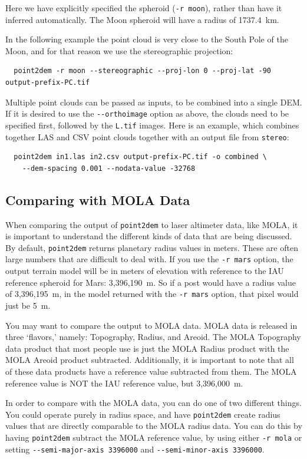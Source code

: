 Here we have explicitly specified the spheroid (\texttt{-r moon}), rather
than have it inferred automatically. The Moon spheroid will have
a radius of 1737.4~km.

In the following example the point cloud is very close to the
South Pole of the Moon, and for that reason we use the stereographic projection:
\begin{verbatim}
  point2dem -r moon --stereographic --proj-lon 0 --proj-lat -90 output-prefix-PC.tif
\end{verbatim}

Multiple point clouds can be passed as inputs, to be combined into a
single \ac{DEM}. If it is desired to use the \texttt{-\/-orthoimage}
option as above, the clouds need to be specified first, followed by the
\texttt{L.tif} images. Here is an example, which combines together LAS
and CSV point clouds together with an output file from {\tt stereo}:
\begin{verbatim}
  point2dem in1.las in2.csv output-prefix-PC.tif -o combined \
    --dem-spacing 0.001 --nodata-value -32768
\end{verbatim}

\subsection{Comparing with MOLA Data}
\label{molacmp}

When comparing the output of \texttt{point2dem} to laser altimeter
data, like MOLA, it is important to understand the different kinds
of data that are being discussed.  By default, \texttt{point2dem}
returns planetary radius values in meters.  These are often large
numbers that are difficult to deal with.  If you use the \texttt{-r
mars} option, the output terrain model will be in meters of elevation
with reference to the IAU reference spheroid for Mars: 3,396,190~m.
So if a post would have a radius value of 3,396,195~m, in the model
returned with the \texttt{-r mars} option, that pixel would just be 5~m.

You may want to compare the output to MOLA data.  MOLA data is
released in three `flavors,' namely: Topography, Radius, and Areoid.
The MOLA Topography data product that most people use is just the MOLA Radius
product with the MOLA Areoid product subtracted.  Additionally, it is
important to note that all of these data products have a reference
value subtracted from them.  The MOLA reference value is NOT the
IAU reference value, but 3,396,000~m.

In order to compare with the MOLA data, you can do one of two different
things.  You could operate purely in radius space, and have
\texttt{point2dem} create radius values that are directly comparable to
the MOLA radius data.  You can do this by having \texttt{point2dem}
subtract the MOLA reference value, by using either \texttt{-r
mola} or setting \texttt{-\/-semi-major-axis 3396000} and
\texttt{-\/-semi-minor-axis 3396000}.

